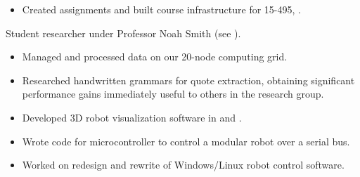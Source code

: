 \setlength{\parskip}{0pt}
\begin{itemize}
\item Created assignments and built course infrastructure for 15-495, .
\end{itemize}
\setlength{\parskip}{8pt}

\setlength{\parskip}{0pt}

Student researcher under Professor Noah Smith (see ).

\begin{itemize}
\item Managed and processed data on
      our 20-node  computing grid.
\item Researched handwritten grammars for quote
      extraction, obtaining significant performance gains immediately
      useful to others in the research group.
\end{itemize}
\setlength{\parskip}{8pt}

\setlength{\parskip}{0pt}
\begin{itemize}
\item Developed 3D robot visualization software in  and .
\item Wrote  code for  microcontroller to control a modular robot over a serial bus.
\item Worked on redesign and rewrite of Windows/Linux robot control software.
\end{itemize}


\section{}

